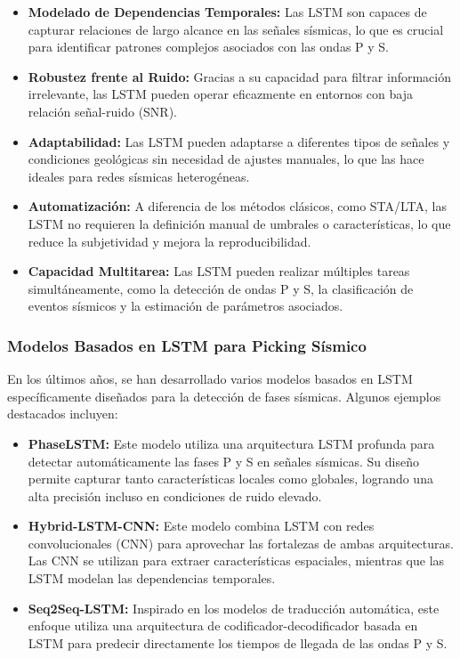 \begin{itemize}
    \item \textbf{Modelado de Dependencias Temporales:} Las LSTM son capaces de capturar relaciones de largo alcance en las señales sísmicas, lo que es crucial para identificar patrones complejos asociados con las ondas P y S.

    \item \textbf{Robustez frente al Ruido:} Gracias a su capacidad para filtrar información irrelevante, las LSTM pueden operar eficazmente en entornos con baja relación señal-ruido (SNR).

    \item \textbf{Adaptabilidad:} Las LSTM pueden adaptarse a diferentes tipos de señales y condiciones geológicas sin necesidad de ajustes manuales, lo que las hace ideales para redes sísmicas heterogéneas.

    \item \textbf{Automatización:} A diferencia de los métodos clásicos, como STA/LTA, las LSTM no requieren la definición manual de umbrales o características, lo que reduce la subjetividad y mejora la reproducibilidad.

    \item \textbf{Capacidad Multitarea:} Las LSTM pueden realizar múltiples tareas simultáneamente, como la detección de ondas P y S, la clasificación de eventos sísmicos y la estimación de parámetros asociados.
\end{itemize}

\subsubsection{Modelos Basados en LSTM para Picking Sísmico}

En los últimos años, se han desarrollado varios modelos basados en LSTM específicamente diseñados para la detección de fases sísmicas. Algunos ejemplos destacados incluyen:

\begin{itemize}
    \item \textbf{PhaseLSTM:} Este modelo utiliza una arquitectura LSTM profunda para detectar automáticamente las fases P y S en señales sísmicas. Su diseño permite capturar tanto características locales como globales, logrando una alta precisión incluso en condiciones de ruido elevado.

    \item \textbf{Hybrid-LSTM-CNN:} Este modelo combina LSTM con redes convolucionales (CNN) para aprovechar las fortalezas de ambas arquitecturas. Las CNN se utilizan para extraer características espaciales, mientras que las LSTM modelan las dependencias temporales.

    \item \textbf{Seq2Seq-LSTM:} Inspirado en los modelos de traducción automática, este enfoque utiliza una arquitectura de codificador-decodificador basada en LSTM para predecir directamente los tiempos de llegada de las ondas P y S.
\end{itemize}

